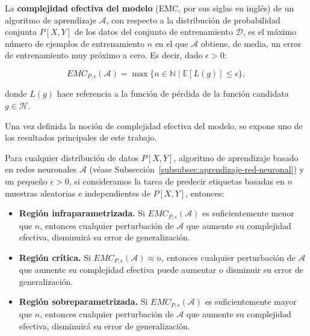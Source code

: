 \begin{definicion}
    La \textbf{complejidad efectiva del modelo} (EMC, por sus siglas en inglés) de un algoritmo de aprendizaje $\mathcal{A}$, con respecto a la distribución de probabilidad conjunta $P[X, Y]$ de los datos del conjunto de entrenamiento $\mathcal{D}$, es el máximo número de ejemplos de entrenamiento $n$ en el que $\mathcal{A}$ obtiene, de media, un error de entrenamiento muy próximo a cero. Es decir, dado $\epsilon > 0$:

    \[
        EMC_{P, \epsilon}(\mathcal{A}) = \max\{ n \in \mathbb{N} \; | \; \mathbb{E}[L(g)] \leq \epsilon \},
    \]  

    donde $L(g)$ hace referencia a la función de pérdida de la función candidata $g \in \mathcal{H}$.
\end{definicion}

Una vez definida la noción de complejidad efectiva del modelo, se expone uno de los resultados principales de este trabajo.

\begin{hipotesis}\label{hipotesis-general-double-descent}
    Para cualquier distribución de datos $P[X, Y]$, algoritmo de aprendizaje basado en redes neuronales $\mathcal{A}$ (véase Subsección~\ref{subsubsec:aprendizaje-red-neuronal}) y un pequeño $\epsilon > 0$, si consideramos la tarea de predecir etiquetas basadas en $n$ muestras aleatorias e independientes de $P[X, Y]$, entonces:

    \begin{itemize}
        \item \textbf{Región infraparametrizada.} Si $EMC_{P, \epsilon}(\mathcal{A})$ es suficientemente menor que $n$, entonces cualquier perturbación de $\mathcal{A}$ que aumente su complejidad efectiva, disminuirá su error de generalización.
        \item \textbf{Región crítica.} Si $EMC_{P, \epsilon}(\mathcal{A}) \approx n$, entonces cualquier perturbación de $\mathcal{A}$ que aumente su complejidad efectiva puede aumentar o disminuir su error de generalización.
        \item \textbf{Región sobreparametrizada.} Si $EMC_{P, \epsilon}(\mathcal{A})$ es suficientemente mayor que $n$, entonces cualquier perturbación de $\mathcal{A}$ que aumente su complejidad efectiva, disminuirá su error de generalización.
    \end{itemize}
\end{hipotesis}

